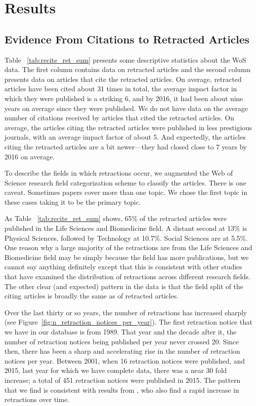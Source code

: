 \documentclass[12pt, letterpaper]{article}
\begin{document}
\section{Results}
\subsection{Evidence From Citations to Retracted Articles}
Table ~\ref{tab:recite_ret_sum} presents some descriptive statistics about the WoS data. The first column contains data on retracted articles and the second column presents data on articles that cite the retracted articles. On average, retracted articles have been cited about 31 times in total, the average impact factor in which they were published is a striking 6, and by 2016, it had been about nine years on average since they were published. We do not have data on the average number of citations received by articles that cited the retracted articles. On average, the articles citing the retracted articles were published in less prestigious journals, with an average impact factor of about 5. And expectedly, the articles citing the retracted articles are a bit newer---they had closed close to 7 years by 2016 on average. 

To describe the fields in which retractions occur, we augmented the Web of Science research field categorization scheme to classify the articles. There is one caveat. Sometimes papers cover more than one topic. We chose the first topic in these cases taking it to be the primary topic. 

As Table ~\ref{tab:recite_ret_sum} shows, 65\% of the retracted articles were published in the Life Sciences and Biomedicine field.  A distant second at 13\% is Physical Sciences, followed by Technology at 10.7\%. Social Sciences are at 5.5\%.  One reason why a large majority of the retractions are from the  Life Sciences and Biomedicine field may be simply because the field has more publications, but we cannot say anything definitely except that this is consistent with other studies that have examined the distribution of retractions across different research fields. The other clear (and expected) pattern in the data is that the field split of the citing articles is broadly the same as of retracted articles.



Over the last thirty or so years, the number of retractions has increased sharply (see Figure~\ref{fig:n_retraction_notices_per_year}). The first retraction notice that we have in our database is from 1989. That year and the decade after it, the number of retraction notices being published per year never crossed 20. Since then, there has been a sharp and accelerating rise in the number of retraction notices per year. Between 2001, when 16 retraction notices were published, and 2015, last year for which we have complete data, there was a near 30 fold increase; a total of 451 retraction notices were published in 2015. The pattern that we find is consistent with results from \citet{steen2013has}, who also find a rapid increase in retractions over time.
\end{document}
